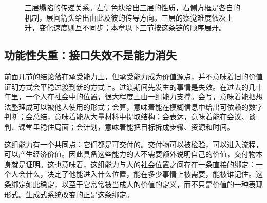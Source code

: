 \begin{figure}[ht]


\caption{三层塌陷的传递关系。左侧色块给出三层的性质，右侧方框是各自的机制，层间箭头给出由此及彼的传导方向。三层的察觉难度依次上升，变化速度则互不同步；本章以下三节按这条链的顺序展开。}
\label{fig:collapse-spiral}
\end{figure}


\subsection{功能性失重：接口失效不是能力消失}


前面几节的结论落在承受能力上，但承受能力成为价值源点，并不意味着旧的价值证明方式会平稳过渡到新的方式上。过渡期间先发生的事情是失效。在过去的几十年里，一个人在社会中的位置，很大程度上由一组能力支撑。会写，意味着能把想法整理成可以被他人使用的形式；会算，意味着能在模糊信息中给出可依赖的数字判断；会总结，意味着能从大量材料中提取结构；会表达，意味着能在会议、谈判、课堂里稳住局面；会计划，意味着能把目标拆成步骤、资源和时间。

这组能力有一个共同点：它们都是可交付的。交付物可以被检验，可以进入流程，可以产生经济价值。因此具备这些能力的人不需要额外说明自己的价值，交付物本身就是证明。这也意味着，这组能力与人的社会位置之间存在一条直接的绑定：一个人会什么，决定了他能进入什么位置，能在多少事情上被需要，能被谁记住。这条绑定如此稳定，以至于它常常被当成人的价值的定义，而不只是价值的一种表现形式。生成式系统改变的正是这条绑定。

